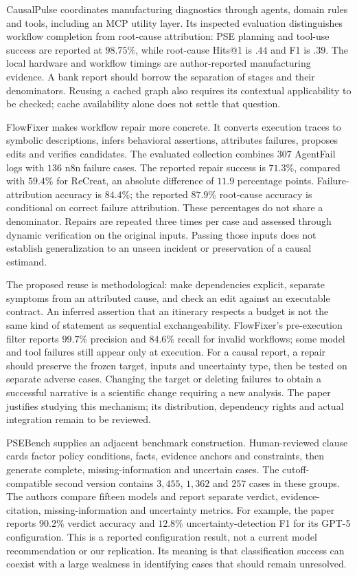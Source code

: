 CausalPulse coordinates manufacturing diagnostics through agents, domain rules
and tools, including an MCP utility layer. Its inspected evaluation distinguishes
workflow completion from root-cause attribution: PSE planning and tool-use
success are reported at \(98.75\%\), while root-cause Hits@1 is \(.44\) and
F1 is \(.39\). The local hardware and workflow timings are author-reported
manufacturing evidence. A bank report should borrow the separation of stages
and their denominators. Reusing a cached graph also requires its contextual
applicability to be checked; cache availability alone does not settle that
question.
\citep{exec13_pulse}

FlowFixer makes workflow repair more concrete. It converts execution traces to
symbolic descriptions, infers behavioral assertions, attributes failures,
proposes edits and verifies candidates. The evaluated collection combines
\(307\) AgentFail logs with \(136\) n8n failure cases. The reported repair
success is \(71.3\%\), compared with \(59.4\%\) for ReCreat, an absolute
difference of \(11.9\) percentage points. Failure-attribution accuracy is
\(84.4\%\); the reported \(87.9\%\) root-cause accuracy is conditional on
correct failure attribution. These percentages do not share a denominator.
Repairs are repeated three times per case and assessed through dynamic
verification on the original inputs. Passing those inputs does not establish
generalization to an unseen incident or preservation of a causal estimand.
\citep{exec16_report_flowfixer}

The proposed reuse is methodological: make dependencies explicit, separate
symptoms from an attributed cause, and check an edit against an executable
contract. An inferred assertion that an itinerary respects a budget is not
the same kind of statement as sequential exchangeability. FlowFixer's
pre-execution filter reports \(99.7\%\) precision and \(84.6\%\) recall for
invalid workflows; some model and tool failures still appear only at execution.
For a causal report, a repair should preserve the frozen target, inputs and
uncertainty type, then be tested on separate adverse cases. Changing the target
or deleting failures to obtain a successful narrative is a scientific change
requiring a new analysis. The paper justifies studying this mechanism; its
distribution, dependency rights and actual integration remain to be reviewed.

PSEBench supplies an adjacent benchmark construction. Human-reviewed clause
cards factor policy conditions, facts, evidence anchors and constraints, then
generate complete, missing-information and uncertain cases. The cutoff-compatible
second version contains \(3{,}455\), \(1{,}362\) and \(257\) cases in these
groups. The authors compare fifteen models and report separate verdict,
evidence-citation, missing-information and uncertainty metrics. For example,
the paper reports \(90.2\%\) verdict accuracy and \(12.8\%\)
uncertainty-detection F1 for its GPT-5 configuration. This is a reported
configuration result, not a current model recommendation or our replication.
Its meaning is that classification success can coexist with a large weakness
in identifying cases that should remain unresolved.
\citep{exec16_report_psebench}

